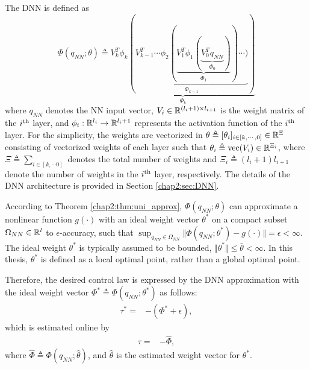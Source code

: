 The DNN is defined as 
\begin{equation}
    \Phi(q_{NN};\theta) \triangleq 
    \underbrace{
        V_k^T  \phi_{k}(
        \underbrace{
        V_{k-1}^T   \cdots \phi_2(
        \underbrace
            {
            V_1^T   \phi_1(
            \underbrace
            {
            V_0^T   q_{NN}
            }_{\Phi_0}
            )
        }_{\Phi_1}
        )\cdots )
        }_{\Phi_{k-1}}
        )
    }_{\Phi_k}
\end{equation}
where $q_{NN}$ denotes the NN input vector, $V_i\in\mathbb{R}^{(l_i+1)\times l_{i+1}}$ is the weight matrix of the $i\textsuperscript{th}$ layer, and $\phi_i: \mathbb{R}^{l_i}\to\mathbb{R}^{l_i+1}$ represents the activation function of the $i\textsuperscript{th}$ layer.
For the simplicity, the weights are vectorized in $\theta\triangleq[\theta_i]_{i\in[k,\cdots,0]}\in\mathbb{R}^{\Xi}$ consisting of vectorized weights of each layer such that $\theta_i\triangleq\text{vec}(V_i)\in\mathbb{R}^{\Xi_i}$, where $\Xi\triangleq \sum_{i\in[k,\cdots 0]}$ denotes the total number of weights and $\Xi_i\triangleq (l_i+1)l_{i+1}$ denote the number of weights in the $i\textsuperscript{th}$ layer, respectively.
The details of the DNN architecture is provided in Section \ref{chap2:sec:DNN}.

According to Theorem \ref{chap2:thm:uni_approx}, $\Phi(q_{NN};\theta)$ can approximate a nonlinear function $g(\cdot)$ with an ideal weight vector $\theta^*$ on a compact subset $\Omega_{NN}\in\mathbb{R}^{l}$ to $\epsilon$-accuracy, such that $\sup_{q_{NN}\in\Omega_{NN}}\Vert \Phi(q_{NN};\theta^*) - g(\cdot) \Vert = \epsilon < \infty$.
The ideal weight $\theta^*$ is typically assumed to be bounded, \ie $\Vert\theta^*\Vert\le \bar\theta<\infty$.
In this thesis, $\theta^*$ is defined as a local optimal point, rather than a global optimal point.

Therefore, the desired control law is expressed by the DNN approximation with the ideal weight vector $\Phi^*\triangleq\Phi(q_{NN};\theta^*)$ as follows:
\begin{align}
    \tau^*=& -(\Phi^*+\epsilon),
\end{align}
which is estimated online by
\begin{align}
    \tau =& -\hat\Phi,
    \label{chap4:eq:approx_control}
\end{align}
where $\hat\Phi\triangleq\Phi(q_{NN};\hat\theta)$, and  $\hat\theta$ is the estimated weight vector for $\theta^*$.

